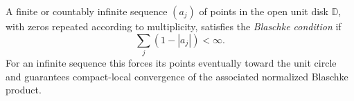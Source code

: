 
A finite or countably infinite sequence $(a_j)$ of points in the open unit disk $\mathbb D$, with zeros repeated according to multiplicity, satisfies the \emph{Blaschke condition} if
\[
\sum_j(1-|a_j|)<\infty.
\]
For an infinite sequence this forces its points eventually toward the unit circle and guarantees compact-local convergence of the associated normalized Blaschke product.
